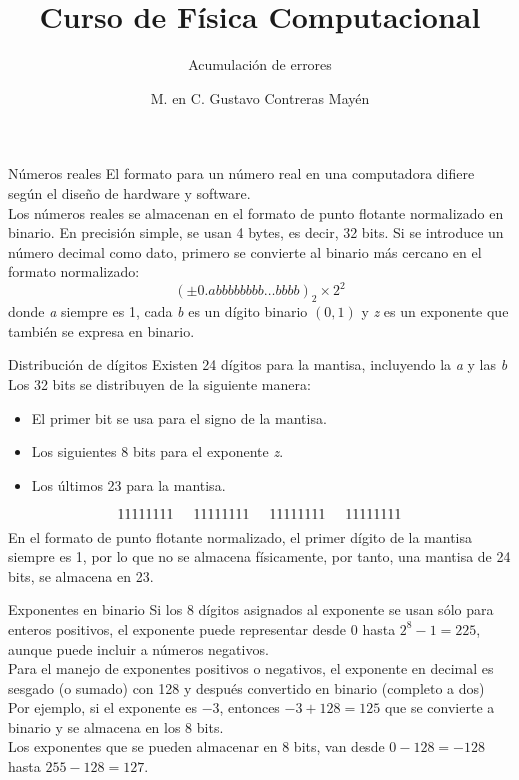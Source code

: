 \documentclass[pdf, azure]{prosper}
\title{Curso de Física Computacional}
\subtitle{Acumulación de errores}
\author{M. en C. Gustavo Contreras Mayén}
\begin{document}
\maketitle
\begin{slide}{Números reales}
El formato para un número real en una computadora difiere según el diseño de hardware y software.
\\
Los números reales se almacenan en el formato de punto flotante normalizado en binario. En precisión simple, se usan 4 bytes, es decir, 32 bits. Si se introduce un número decimal como dato, primero se convierte al binario más cercano en el formato normalizado:
\[ ( \pm 0.abbbbbbbb \ldots bbbb )_{2} \times 2^{2} \]
donde \textit{a} siempre es 1, cada \textit{b} es un dígito binario $(0,1)$ y \textit{z} es un exponente que también se expresa en binario.
\end{slide}
\begin{slide}{Distribución de dígitos}
Existen 24 dígitos para la mantisa, incluyendo la \textit{a} y las \textit{b}
\\ 
Los 32 bits se distribuyen de la siguiente manera:
\begin{itemize}
\item El primer bit se usa para el signo de la mantisa.
\item Los siguientes 8 bits para el exponente \textit{z}.
\item Los últimos 23 para la mantisa.
\end{itemize}
\[ 11111111 \hspace{0.5cm} 11111111 \hspace{0.5cm} 11111111 \hspace{0.5cm}11111111 \]
En el formato de punto flotante  normalizado, el primer dígito de la mantisa siempre es 1, por lo que no se almacena físicamente, por tanto, una mantisa de 24 bits, se almacena en 23.
\end{slide}
\begin{slide}{Exponentes en binario}
Si los 8 dígitos asignados al exponente se usan sólo para enteros positivos, el exponente puede representar desde $0$ hasta $2^{8}-1=225$, aunque puede incluir a números negativos.
\\
Para el manejo de exponentes positivos o negativos, el exponente en decimal es sesgado (o sumado) con 128 y después convertido en binario (completo a dos)
\\Por ejemplo, si el exponente es $-3$, entonces $-3+128=125$ que se convierte a binario y se almacena en los 8 bits.
\\
Los exponentes que se pueden almacenar en 8 bits, van desde $0-128=-128$ hasta $255-128=127$.
\end{slide}
\end{document}
